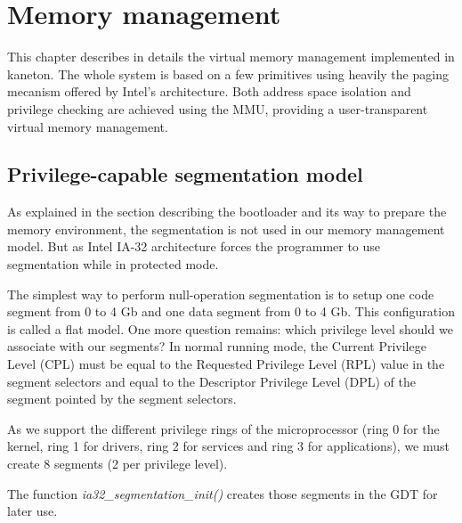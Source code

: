 %
%
%
%
%
%

%
%

\chapter{Memory management}

This chapter describes in details the virtual memory management
implemented in kaneton. The whole system is based on a few primitives
using heavily the paging mecanism offered by Intel's
architecture. Both address space isolation and privilege checking are
achieved using the MMU, providing a user-transparent virtual memory
management.

\newpage

%
%

\section{Privilege-capable segmentation model}

As explained in the section describing the bootloader and its way to
prepare the memory environment, the segmentation is not used in our
memory management model. But as Intel IA-32 architecture forces the
programmer to use segmentation while in protected mode.

The simplest way to perform null-operation segmentation is to setup
one code segment from 0 to 4 Gb and one data segment from 0 to 4
Gb. This configuration is called a flat model. One more question
remains: which privilege level should we associate with our segments?
In normal running mode, the Current Privilege Level (CPL) must be
equal to the Requested Privilege Level (RPL) value in the segment
selectors and equal to the Descriptor Privilege Level (DPL) of the
segment pointed by the segment selectors.

As we support the different privilege rings of the microprocessor
(ring 0 for the kernel, ring 1 for drivers, ring 2 for services and
ring 3 for applications), we must create 8 segments (2 per privilege
level).

The function \textit{ia32\_segmentation\_init()} creates those
segments in the GDT for later use.

